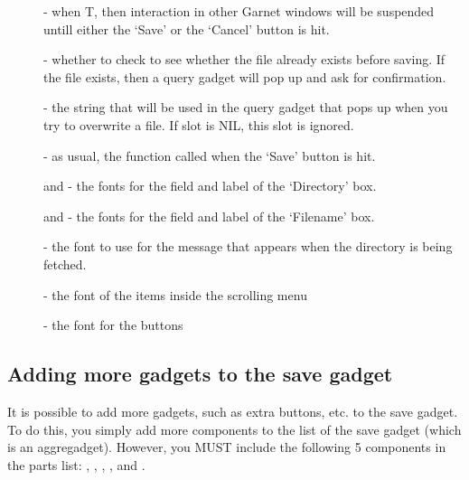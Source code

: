 \begin{description}
\item[]  - when T, then interaction in other Garnet windows will be
suspended untill either the `Save' or the `Cancel' button is hit.

\item[]  - whether to check to see whether the file
already exists before saving.  If the file exists, then a query gadget
will pop up and ask for confirmation.

\item[]  - the string that will be used in the query
gadget that pops up when you try to overwrite a file.  If
 slot is NIL, this slot is ignored.

\item[]  - as usual, the function called when the `Save'
button is hit.

\item[]  and  - the fonts
for the field and label of the `Directory' box.

\item[]  and  - the fonts
for the field and label of the `Filename' box.

\item[]  - the font to use for the message that appears
when the directory is being fetched.

\item[]  - the font of the items inside the scrolling menu

\item[]  - the font for the buttons

\end{description}


\subsection{Adding more gadgets to the save gadget}

It is possible to add more gadgets, such as extra buttons, etc. to the
save gadget.  To do this, you simply add more components to the 
list of the save gadget (which is an aggregadget).  However, you MUST
include the following 5 components in the parts list: ,
, , , and
.

